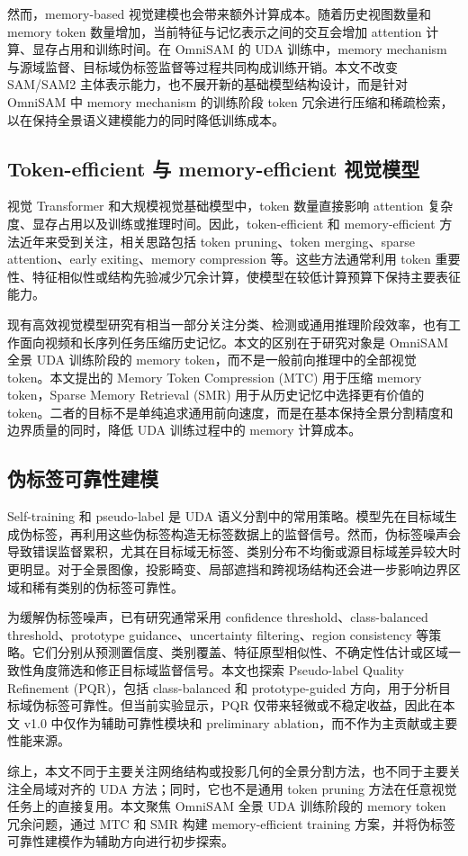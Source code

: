 然而，memory-based 视觉建模也会带来额外计算成本。随着历史视图数量和 memory token 数量增加，当前特征与记忆表示之间的交互会增加 attention 计算、显存占用和训练时间。在 OmniSAM 的 UDA 训练中，memory mechanism 与源域监督、目标域伪标签监督等过程共同构成训练开销。本文不改变 SAM/SAM2 主体表示能力，也不展开新的基础模型结构设计，而是针对 OmniSAM 中 memory mechanism 的训练阶段 token 冗余进行压缩和稀疏检索，以在保持全景语义建模能力的同时降低训练成本。

\subsection{Token-efficient 与 memory-efficient 视觉模型}
视觉 Transformer 和大规模视觉基础模型中，token 数量直接影响 attention 复杂度、显存占用以及训练或推理时间。因此，token-efficient 和 memory-efficient 方法近年来受到关注，相关思路包括 token pruning、token merging、sparse attention、early exiting、memory compression 等。这些方法通常利用 token 重要性、特征相似性或结构先验减少冗余计算，使模型在较低计算预算下保持主要表征能力。

现有高效视觉模型研究有相当一部分关注分类、检测或通用推理阶段效率，也有工作面向视频和长序列任务压缩历史记忆。本文的区别在于研究对象是 OmniSAM 全景 UDA 训练阶段的 memory token，而不是一般前向推理中的全部视觉 token。本文提出的 Memory Token Compression (MTC) 用于压缩 memory token，Sparse Memory Retrieval (SMR) 用于从历史记忆中选择更有价值的 token。二者的目标不是单纯追求通用前向速度，而是在基本保持全景分割精度和边界质量的同时，降低 UDA 训练过程中的 memory 计算成本。

\subsection{伪标签可靠性建模}
Self-training 和 pseudo-label 是 UDA 语义分割中的常用策略。模型先在目标域生成伪标签，再利用这些伪标签构造无标签数据上的监督信号。然而，伪标签噪声会导致错误监督累积，尤其在目标域无标签、类别分布不均衡或源目标域差异较大时更明显。对于全景图像，投影畸变、局部遮挡和跨视场结构还会进一步影响边界区域和稀有类别的伪标签可靠性。

为缓解伪标签噪声，已有研究通常采用 confidence threshold、class-balanced threshold、prototype guidance、uncertainty filtering、region consistency 等策略。它们分别从预测置信度、类别覆盖、特征原型相似性、不确定性估计或区域一致性角度筛选和修正目标域监督信号。本文也探索 Pseudo-label Quality Refinement (PQR)，包括 class-balanced 和 prototype-guided 方向，用于分析目标域伪标签可靠性。但当前实验显示，PQR 仅带来轻微或不稳定收益，因此在本文 v1.0 中仅作为辅助可靠性模块和 preliminary ablation，而不作为主贡献或主要性能来源。

综上，本文不同于主要关注网络结构或投影几何的全景分割方法，也不同于主要关注全局域对齐的 UDA 方法；同时，它也不是通用 token pruning 方法在任意视觉任务上的直接复用。本文聚焦 OmniSAM 全景 UDA 训练阶段的 memory token 冗余问题，通过 MTC 和 SMR 构建 memory-efficient training 方案，并将伪标签可靠性建模作为辅助方向进行初步探索。
